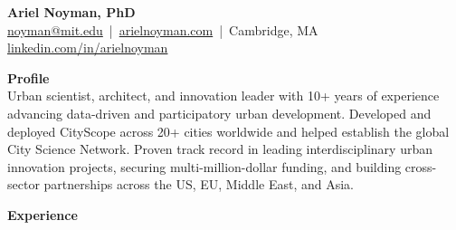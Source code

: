 \documentclass[a4paper,10pt]{article}
\begin{document}
\begin{center}
      {\LARGE \textbf{Ariel Noyman, PhD}} \\
      \href{mailto:noyman@mit.edu}{noyman@mit.edu} \,|\, \href{https://arielnoyman.com}{arielnoyman.com} \,|\, Cambridge, MA \\
      \href{https://www.linkedin.com/in/arielnoyman}{linkedin.com/in/arielnoyman}
\end{center}


\vspace{0.8em}

\noindent \textbf{Profile} \\
Urban scientist, architect, and innovation leader with 10+ years of experience advancing data-driven and participatory urban development. Developed and deployed CityScope across 20+ cities worldwide and helped establish the global City Science Network. Proven track record in leading interdisciplinary urban innovation projects, securing multi-million-dollar funding, and building cross-sector partnerships across the US, EU, Middle East, and Asia.


\vspace{0.8em}

\noindent \textbf{Experience}
\end{document}
